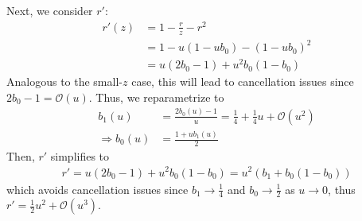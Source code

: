 \documentclass{article}
\begin{document}
Next, we consider $r'$:
%
\begin{align}
  r'(z) & = 1 - \frac{r}{z} - r^2                                                     \\
        & = 1 - u(1 - u b_0) - (1 - u b_0)^2                                          \\
        & = u (2 b_0 - 1) + u^2 b_0 (1 - b_0) \label{eq:r-prime-large-reparametrized}
\end{align}
%
Analogous to the small-$z$ case, this will lead to cancellation issues since $2b_0 - 1 = \mathcal{O}(u)$.
Thus, we reparametrize to
%
\begin{align}
  b_1(u)             & = \frac{2b_0(u)-1}{u} = \frac{1}{4} + \frac{1}{4} u + \mathcal{O}(u^2) \\
  \Rightarrow b_0(u) & = \frac{1 + u b_1(u)}{2}
\end{align}
%
Then, $r'$ simplifies to
%
\begin{align}\label{eq:r-prime-large-reparametrized-simplified}
  r' = u(2b_0-1) + u^2 b_0(1-b_0) = u^2 (b_1 + b_0(1-b_0))
\end{align}
%
which avoids cancellation issues since $b_1 \to \frac{1}{4}$ and $b_0 \to \frac{1}{2}$ as $u \to 0$, thus $r' = \frac{1}{2} u^2 + \mathcal{O}(u^3)$.
\end{document}
